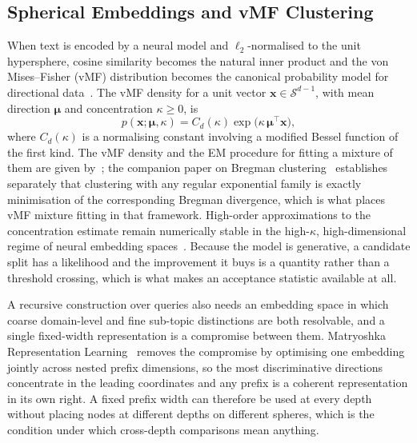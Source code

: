 \subsection*{Spherical Embeddings and vMF Clustering}

When text is encoded by a neural model and $\ell_2$-normalised to the
unit hypersphere, cosine similarity becomes the natural inner product
and the von Mises--Fisher (vMF) distribution becomes the canonical
probability model for directional data~\parencite{banerjee2005vmf}.
The vMF density for a unit vector $\mathbf{x} \in \mathcal{S}^{d-1}$,
with mean direction $\boldsymbol{\mu}$ and concentration
$\kappa \geq 0$, is
\begin{equation}
    p(\mathbf{x};\boldsymbol{\mu},\kappa) =
    C_d(\kappa)\exp\!\bigl(\kappa\,\boldsymbol{\mu}^\top\mathbf{x}\bigr),
    \label{eq:vmf}
\end{equation}
where $C_d(\kappa)$ is a normalising constant involving a modified
Bessel function of the first kind. The vMF density and the EM
procedure for fitting a mixture of them are given
by~\textcite{banerjee2005vmf}; the companion paper on Bregman
clustering~\parencite{banerjee2005bregman} establishes separately
that clustering with any regular exponential family is exactly
minimisation of the corresponding Bregman divergence, which is what
places vMF mixture fitting in that framework. High-order
approximations to the concentration estimate remain numerically
stable in the high-$\kappa$, high-dimensional regime of neural
embedding spaces~\parencite{banerjee2005vmf, hornik2014vmf}.
Because the model is generative, a candidate split has a likelihood
and the improvement it buys is a quantity rather than a threshold
crossing, which is what makes an acceptance statistic available at
all.

A recursive construction over queries also needs an embedding space
in which coarse domain-level and fine sub-topic distinctions are both
resolvable, and a single fixed-width representation is a compromise
between them. Matryoshka Representation
Learning~\parencite{kusupati2022mrl} removes the compromise by
optimising one embedding jointly across nested prefix dimensions, so
the most discriminative directions concentrate in the leading
coordinates and any prefix is a coherent representation in its own
right. A fixed prefix width can therefore be used at every depth
without placing nodes at different depths on different spheres, which
is the condition under which cross-depth comparisons mean anything.

